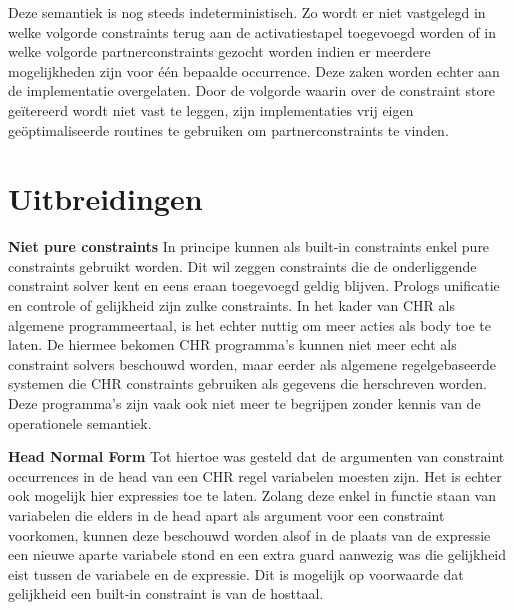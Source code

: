 Deze semantiek is nog steeds indeterministisch. Zo wordt er niet vastgelegd in welke volgorde constraints terug aan de activatiestapel toegevoegd worden of in welke volgorde partnerconstraints gezocht worden indien er meerdere mogelijkheden zijn voor \'e\'en bepaalde occurrence. Deze zaken worden echter aan de implementatie overgelaten. Door de volgorde waarin over de constraint store ge\"itereerd wordt niet vast te leggen, zijn implementaties vrij eigen ge\"optimaliseerde routines te gebruiken om partnerconstraints te vinden.

\section{Uitbreidingen}

{\bf Niet pure constraints} In principe kunnen als built-in constraints enkel pure constraints gebruikt worden. Dit wil zeggen constraints die de onderliggende constraint solver kent en eens eraan toegevoegd geldig blijven. Prologs unificatie en controle of gelijkheid zijn zulke constraints. In het kader van CHR als algemene programmeertaal, is het echter nuttig om meer acties als body toe te laten. De hiermee bekomen CHR programma's kunnen niet meer echt als constraint solvers beschouwd worden, maar eerder als algemene regelgebaseerde systemen die CHR constraints gebruiken als gegevens die herschreven worden. Deze programma's zijn vaak ook niet meer te begrijpen zonder kennis van de operationele semantiek.

{\bf Head Normal Form} Tot hiertoe was gesteld dat de argumenten van constraint occurrences in de head van een CHR regel variabelen moesten zijn. Het is echter ook mogelijk hier expressies toe te laten. Zolang deze enkel in functie staan van variabelen die elders in de head apart als argument voor een constraint voorkomen, kunnen deze beschouwd worden alsof in de plaats van de expressie een nieuwe aparte variabele stond en een extra guard aanwezig was die gelijkheid eist tussen de variabele en de expressie. Dit is mogelijk op voorwaarde dat gelijkheid een built-in constraint is van de hosttaal.

